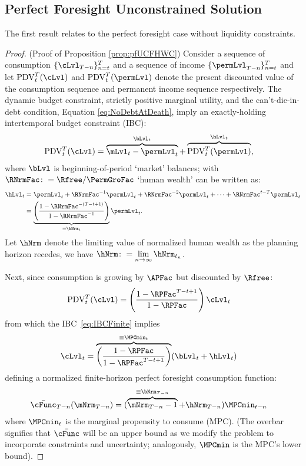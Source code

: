 \documentclass[\econtexRoot/BufferStockTheory]{subfiles}
\begin{document}
\subsection{Perfect Foresight Unconstrained Solution}\label{subsec:ApndxUCPF}

The first result relates to the perfect foresight case without liquidity constraints. 

\begin{proof}(Proof of Proposition \ref{prop:pfUCFHWC})
Consider a sequence of consumption $\{\cLvl_{T-n}\}_{n= t}^{T}$ and a sequence of income $\{\permLvl_{T-n}\}_{n= t}^{T}$  and let $\mathrm{PDV}_{t}^{T}(\cLvl)$  and $\mathrm{PDV}_{t}^{T}(\permLvl)$ denote the present discounted value of the consumption sequence and permanent income sequence respectively. The dynamic budget constraint, strictly positive marginal utility, and the can't-die-in-debt condition, Equation \eqref{eq:NoDebtAtDeath}, imply an exactly-holding intertemporal budget constraint (IBC):
%
%
\begin{align}
  \mathrm{PDV}_{t}^{T}(\cLvl)  & = \overbrace{\mLvl_{t}-\permLvl_{t}}^{\bLvl_{t}}+\overbrace{\mathrm{PDV}_{t}^{T}(\permLvl)}^{\hLvl_{t}}, \label{eq:IBCFinite}
\end{align} \hypertarget{FHWFacDefn}{}\hypertarget{PFRNrmDefn}{}
where $\bLvl$ is beginning-of-period `market' balances; with $\RNrmFac \colon = \Rfree/\PermGroFac$ `human wealth' can be written as:
%
% 
\begin{align}
  \hLvl_{t}  & = \permLvl_{t}+\RNrmFac^{-1} \permLvl_{t} + \RNrmFac^{-2} \permLvl_{t} + \cdots + \RNrmFac^{t-T} \permLvl_{t} \notag
  \\  & = \underbrace{\left(\frac{1-\RNrmFac^{-(T-t+1)}}{1-\RNrmFac^{-1}}\right)}_{\equiv \hNrm_{t}}\permLvl_{t} \label{eq:HDef}.
\end{align}\hypertarget{FHWC}{}
%
%
Let $\hNrm$ denote the limiting value of normalized human wealth as the planning horizon recedes, we have  $\hNrm \colon = \lim\limits_{n \rightarrow \infty} \hNrm_{t_{n}}$.  

Next, since consumption is growing by $\APFac$ but discounted by $\Rfree$:
\begin{align*}
  \mathrm{PDV}_{t}^{T}(\cLvl)  & = \left(\frac{1-\RPFac^{T-t+1}}{1-\RPFac}\right)\cLvl_{t}
\end{align*}
from which the IBC~\eqref{eq:IBCFinite} implies
\begin{align}
  \cLvl_{t}  & = \overbrace{\left(\frac{1-\RPFac}{1-\RPFac^{T-t+1}}\right)}^{\equiv \MPCmin_{t}}
               (\bLvl_{t}+\hLvl_{t})   \label{eq:WDef}
\end{align}
defining a normalized finite-horizon perfect foresight consumption function:\hypertarget{MPCminDefn}{}
%
%
\begin{align*}
  \bar{\cFunc}_{T-n}(\mNrm_{T-n})  & = (\overbrace{\mNrm_{T-n}-1}^{
                                     \equiv\bNrm_{T-n}}+\hNrm_{T-n})\MPCmin_{t-n}
\end{align*}
%
%
where $\MPCmin_{t}$ is the marginal propensity to consume (MPC). (The overbar signifies that $\bar{\cFunc}$ will be an upper bound as we modify the problem to incorporate constraints and uncertainty; analogously, $\MPCmin$ is the MPC's lower bound). 


\end{proof}
\end{document}
